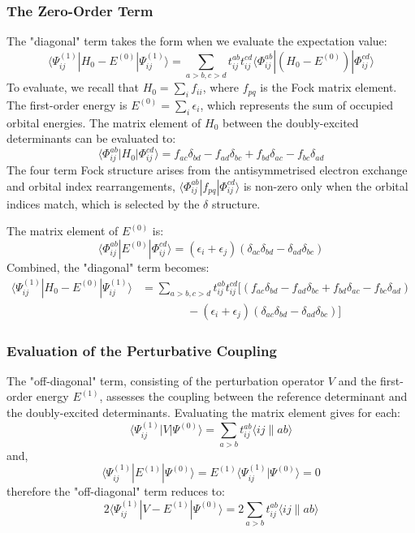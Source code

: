 \subsubsection{The Zero-Order Term}
The "diagonal" term takes the form when we evaluate the expectation value:
\begin{equation}
    \langle\Psi^{(1)}_{ij}|H_0 - E^{(0)}|\Psi^{(1)}_{ij}\rangle = \sum_{a>b,c>d} t_{ij}^{ab} t_{ij}^{cd} \langle\Phi_{ij}^{ab}|(H_0 - E^{(0)})|\Phi_{ij}^{cd}\rangle
\end{equation}
To evaluate, we recall that $H_0 = \sum_i f_{ii}$, where $f_{pq}$ is the Fock matrix element. The first-order energy is $E^{(0)} = \sum_i \epsilon_i$, which represents the sum of occupied orbital energies. The matrix element of $H_0$ between the doubly-excited determinants can be evaluated to:
\begin{equation}
    \langle\Phi_{ij}^{ab}|H_0|\Phi_{ij}^{cd}\rangle = f_{ac}\delta_{bd} - f_{ad}\delta_{bc} + f_{bd}\delta_{ac} - f_{bc}\delta_{ad}
\end{equation}
The four term Fock structure arises from the antisymmetrised electron exchange and orbital index rearrangements, $\langle\Phi_{ij}^{ab}|f_{pq}|\Phi_{ij}^{cd}\rangle$ is non-zero only when the orbital indices match, which is selected by the $\delta$ structure.

The matrix element of $E^{(0)}$ is:
\begin{equation}
    \langle\Phi_{ij}^{ab}|E^{(0)}|\Phi_{ij}^{cd}\rangle = (\epsilon_i + \epsilon_j)(\delta_{ac}\delta_{bd} - \delta_{ad}\delta_{bc})   
\end{equation}
Combined, the "diagonal" term becomes:
\begin{align}
    \langle\Psi^{(1)}_{ij}|H_0 - E^{(0)}|\Psi^{(1)}_{ij}\rangle &= \sum_{a>b,c>d} t_{ij}^{ab} t_{ij}^{cd} [ (f_{ac}\delta_{bd} - f_{ad}\delta_{bc} + f_{bd}\delta_{ac} - f_{bc}\delta_{ad}) \\ &\qquad \qquad - (\epsilon_i + \epsilon_j)(\delta_{ac}\delta_{bd} - \delta_{ad}\delta_{bc}) ]
\end{align}


\subsubsection{Evaluation of the Perturbative Coupling}
The "off-diagonal" term, consisting of the perturbation operator $V$ and the first-order energy $E^{(1)}$, assesses the coupling between the reference determinant and the doubly-excited determinants. Evaluating the matrix element gives for each:
\begin{equation}
    \langle\Psi^{(1)}_{ij}|V|\Psi^{(0)}\rangle = \sum_{a>b} t_{ij}^{ab} \langle ij\|ab\rangle
\end{equation}
and,
\begin{equation}
    \langle\Psi^{(1)}_{ij}|E^{(1)}|\Psi^{(0)}\rangle = E^{(1)} \langle\Psi^{(1)}_{ij}|\Psi^{(0)}\rangle = 0
\end{equation}
therefore the "off-diagonal" term reduces to:
\begin{equation}
    2\langle\Psi^{(1)}_{ij}|V - E^{(1)}|\Psi^{(0)}\rangle = 2\sum_{a>b} t_{ij}^{ab} \langle ij\|ab\rangle
\end{equation}


